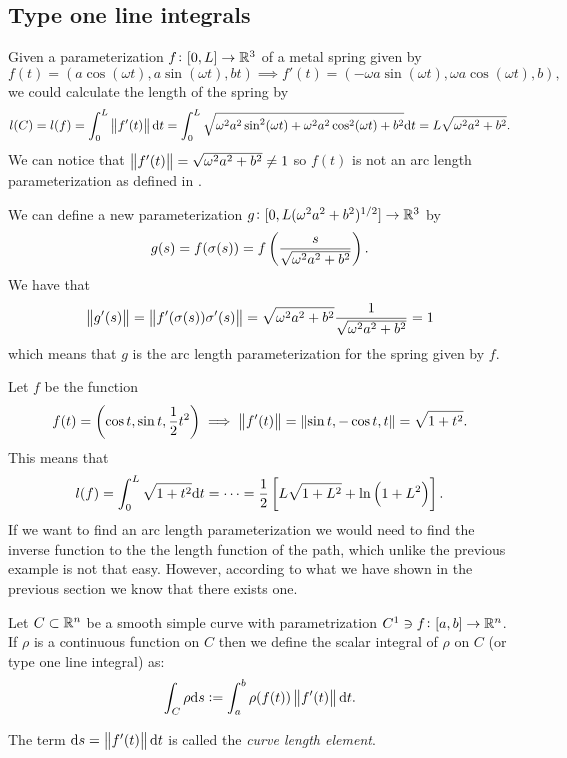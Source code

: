 \documentclass[11pt,a4paper]{article}
\begin{document}
\subsection{Type one line integrals}
\begin{example}
  \label{exmp:metal-spring}
  Given a parameterization $f \colon [0,L] \to \mathbb{R}^3$ of a metal spring
  given by
  \[
    f(t) = (a \cos(\omega t), a \sin(\omega t), bt) \implies
    f'(t) = (- \omega a \sin(\omega t), \omega a \cos(\omega t), b),
  \]
  we could calculate the length of the spring by
  \[
    l(C) = l(f) =
    \int_{0}^{L} \left\lVert f'(t)\right\rVert \mathrm{d} t =
    \int_{0}^{L}
    \sqrt{\omega^2 a^2 \sin^2(\omega t) + \omega^2 a^2 \cos^2(\omega t) + b^2} 
    \mathrm{d} t =
    L \sqrt{\omega^2 a^2 + b^2}.
  \]
  We can notice that $\left\lVert f'(t)\right\rVert = \sqrt{\omega^2 a^2 + b^2} \neq 1$
  so $f(t)$ is not an arc length parameterization as defined in
  .
  
  We can define a new parameterization
  $g \colon [0,L (\omega^2 a^2 + b^2)^{1/2}] \to \mathbb{R}^3$ by
  \[
    g(s) = f(\sigma(s)) = f\del{\frac{s}{\sqrt{\omega^2 a^2 + b^2}}}.
  \]
  We have that
  \[
    \left\lVert g'(s)\right\rVert =
    \left\lVert f'(\sigma(s)) \sigma'(s)\right\rVert =
    \sqrt{\omega^2 a^2 + b^2} \frac{1}{\sqrt{\omega^2 a^2 + b^2}} = 1
  \]
  which means that $g$ is the arc length parameterization for the spring
  given by $f$.
\end{example}

\begin{example}
  Let $f$ be the function
  \[
    f(t) = \del{\cos t, \sin t, \half t^2} \implies
    \norm{f'(t)} = \norm{\sin t, -\cos t, t} = \sqrt{1 + t^2}.
  \]
  This means that
  \[
    l(f) =
    \int_{0}^{L} \sqrt{1 + t^2} \dt = \cdots =
    \half \left[L \sqrt{1 + L^2} + \ln\del{1 + L^2}\right].
  \]
  If we want to find an arc length parameterization we would need to
  find the inverse function to the the length function of the path,
  which unlike the previous example is not that easy.
  However, according to what we have shown in the previous section
  we know that there exists one.
\end{example}

\begin{definition}
  \label{def:type-one-line-integral}
  Let $C \subset \mathbb{R}^n$ be a smooth simple curve with 
  parametrization $C^1 \ni f \colon [a,b] \to \mathbb{R}^n$. If $\rho$ is
  a continuous function on $C$ then we define the 
  scalar integral of $\rho$ on $C$ (or type one line integral) as:
  \[
    \int_{C} \rho \mathrm{d} s :=
    \int_{a}^{b} \rho(f(t)) \left\lVert f'(t)\right\rVert \mathrm{d} t.
  \]
\end{definition}
\begin{remark}
  \label{rmk:curve-length-element}
  The term $\mathrm{d} s = \left\lVert f'(t)\right\rVert \mathrm{d} t$
  is called the \textit{curve length element}.
\end{remark}
\end{document}
